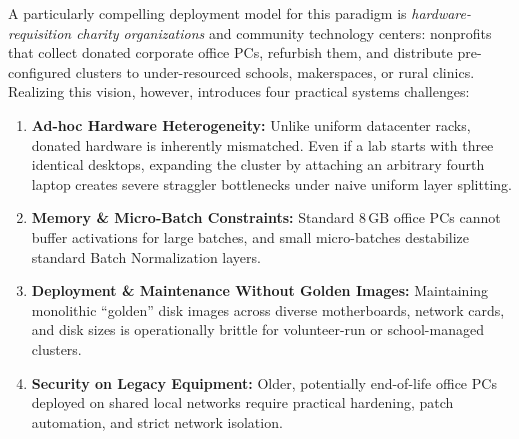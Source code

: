 \documentclass[conference]{IEEEtran}
\begin{document}
A particularly compelling deployment model for this paradigm is \textit{hardware-requisition charity organizations} and community technology centers: nonprofits that collect donated corporate office PCs, refurbish them, and distribute pre-configured clusters to under-resourced schools, makerspaces, or rural clinics. Realizing this vision, however, introduces four practical systems challenges:
\begin{enumerate}
    \item \textbf{Ad-hoc Hardware Heterogeneity:} Unlike uniform datacenter racks, donated hardware is inherently mismatched. Even if a lab starts with three identical desktops, expanding the cluster by attaching an arbitrary fourth laptop creates severe straggler bottlenecks under naive uniform layer splitting.
    \item \textbf{Memory \& Micro-Batch Constraints:} Standard 8\,GB office PCs cannot buffer activations for large batches, and small micro-batches destabilize standard Batch Normalization layers.
    \item \textbf{Deployment & Maintenance Without Golden Images:} Maintaining monolithic ``golden'' disk images across diverse motherboards, network cards, and disk sizes is operationally brittle for volunteer-run or school-managed clusters.
    \item \textbf{Security on Legacy Equipment:} Older, potentially end-of-life office PCs deployed on shared local networks require practical hardening, patch automation, and strict network isolation.
\end{enumerate}
\end{document}
